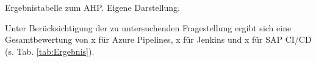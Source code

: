 \begin{center}
	\begin{table}[H]
		\centering
		\caption[Ergebnistabelle zum AHP]{Ergebnistabelle zum AHP. Eigene Darstellung.}
		\label{tab:Ergebnis}
	\end{table}
\end{center}
\vspace*{-15mm}
Unter Berücksichtigung der zu untersuchenden Fragestellung ergibt sich eine Gesamtbewertung von x für Azure Pipelines, x für Jenkins und x für SAP CI/CD (s. Tab. \ref{tab:Ergebnis}).

